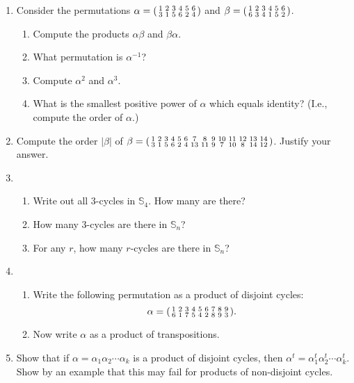 \documentclass[11pt]{article}
\newenvironment{problems}
{
 \begin{enumerate}[topsep=1pt,itemsep=0pt,parsep=2pt,leftmargin=0.6cm,%
 label={\arabic*.}, ref=\arabic*] \small
}
{
 \end{enumerate}
}
\theoremstyle{definition}
\newcommand{\Sym}{\mathbb{S}}
\newenvironment{perm}[2]{\left(\begin{smallmatrix}#1 \\ #2}{\end{smallmatrix}\right)}
\begin{document}
\begin{problems}
\item Consider the permutations $\alpha = 
  \begin{perm}
    {1&2&3&4&5&6}{3&1&5&6&2&4}
  \end{perm}$ and $\beta =
  \begin{perm}
    {1&2&3&4&5&6}{6&3&4&1&5&2}
  \end{perm}$.
\begin{enumerate}
\item Compute the products $\alpha\beta$ and $\beta\alpha$.

\item What permutation is $\alpha^{-1}$? 

\item Compute $\alpha^2$ and $\alpha^3$.

\item What is the smallest positive power of $\alpha$ which equals
  identity? (I.e., compute the order of $\alpha$.)  
\end{enumerate}

\item Compute the order $|\beta|$ of $\beta = \begin{perm}
    {1&2&3&4&5&6&7&8&9&10&11&12&13&14}{3&1&5&6&2&4&13&11&9&7&10&8&14&12}
  \end{perm}$. Justify your answer. 


\item 
\begin{enumerate}
\item Write out all 3-cycles in $\Sym_4$. How many are there?
\item How many 3-cycles are there in $\Sym_n$?
\item For any $r$, how many $r$-cycles are there in $\Sym_n$?
\end{enumerate}


\item 
\begin{enumerate}
\item Write the following permutation as a product of disjoint
  cycles:
  \[ \alpha =
  \begin{perm}
    {1&2&3&4&5&6&7&8&9}{6&1&7&5&4&2&8&9&3} 
  \end{perm}.
  \]

\item Now write $\alpha$ as a product of transpositions. 
\end{enumerate}

\item Show that if $\alpha = \alpha_1 \alpha_2 \cdots \alpha_k$ is a
  product of disjoint cycles, then $\alpha^t = \alpha_1^t \alpha_2^t
  \cdots \alpha_k^t$. Show by an example that this may fail for
  products of non-disjoint cycles.



\end{problems}
\end{document}
